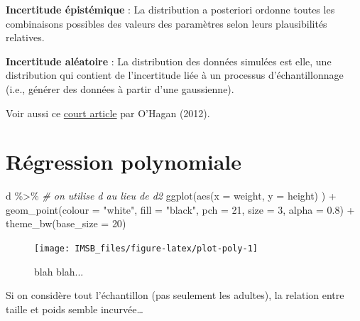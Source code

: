 \documentclass[
  a4paper,11pt,twoside,onecolumn,openright,final,oldfontcommands]{memoir}
\newenvironment{Shaded}{\begin{snugshade}}{\end{snugshade}}
\newcommand{\AttributeTok}[1]{\textcolor[rgb]{0.77,0.63,0.00}{#1}}
\newcommand{\CommentTok}[1]{\textcolor[rgb]{0.56,0.35,0.01}{\textit{#1}}}
\newcommand{\DecValTok}[1]{\textcolor[rgb]{0.00,0.00,0.81}{#1}}
\newcommand{\FloatTok}[1]{\textcolor[rgb]{0.00,0.00,0.81}{#1}}
\newcommand{\FunctionTok}[1]{\textcolor[rgb]{0.00,0.00,0.00}{#1}}
\newcommand{\NormalTok}[1]{#1}
\newcommand{\SpecialCharTok}[1]{\textcolor[rgb]{0.00,0.00,0.00}{#1}}
\newcommand{\StringTok}[1]{\textcolor[rgb]{0.31,0.60,0.02}{#1}}
\theoremstyle{definition}
\theoremstyle{definition}
\theoremstyle{definition}
\theoremstyle{definition}
\theoremstyle{remark}
\begin{document}
\textbf{Incertitude épistémique} : La distribution a posteriori ordonne toutes les combinaisons possibles des valeurs des paramètres selon leurs plausibilités relatives.

\textbf{Incertitude aléatoire} : La distribution des données simulées est elle, une distribution qui contient de l'incertitude liée à un processus d'échantillonnage (i.e., générer des données à partir d'une gaussienne).

Voir aussi ce \href{http://www.stat.columbia.edu/~gelman/stuff_for_blog/ohagan.pdf}{court article} par O'Hagan (2012).

\hypertarget{ruxe9gression-polynomiale}{%
\section{Régression polynomiale}\label{ruxe9gression-polynomiale}}

\begin{Shaded}
\begin{Highlighting}[]
\NormalTok{d }\SpecialCharTok{\%\textgreater{}\%} \CommentTok{\# on utilise d au lieu de d2}
  \FunctionTok{ggplot}\NormalTok{(}\FunctionTok{aes}\NormalTok{(}\AttributeTok{x =}\NormalTok{ weight, }\AttributeTok{y =}\NormalTok{ height) ) }\SpecialCharTok{+}
  \FunctionTok{geom\_point}\NormalTok{(}\AttributeTok{colour =} \StringTok{"white"}\NormalTok{, }\AttributeTok{fill =} \StringTok{"black"}\NormalTok{, }\AttributeTok{pch =} \DecValTok{21}\NormalTok{, }\AttributeTok{size =} \DecValTok{3}\NormalTok{, }\AttributeTok{alpha =} \FloatTok{0.8}\NormalTok{) }\SpecialCharTok{+}
  \FunctionTok{theme\_bw}\NormalTok{(}\AttributeTok{base\_size =} \DecValTok{20}\NormalTok{)}
\end{Highlighting}
\end{Shaded}

\begin{figure}[!htb]

{\centering \texttt{[image: IMSB\_files/figure-latex/plot-poly-1]} 

}

\caption{blah blah...}\label{fig:plot-poly}
\end{figure}

Si on considère tout l'échantillon (pas seulement les adultes), la relation entre taille et poids semble incurvée\ldots{}
\end{document}
